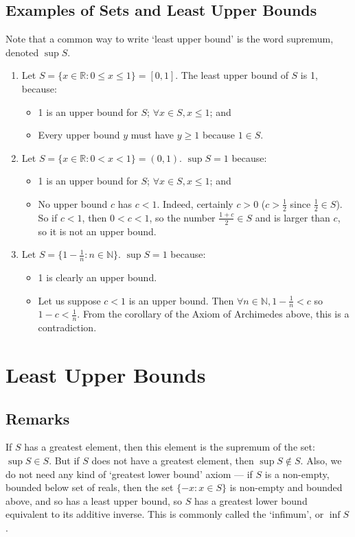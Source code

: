 \documentclass{article}
\begin{document}
\subsection{Examples of Sets and Least Upper Bounds}
Note that a common way to write `least upper bound' is the word supremum, denoted $\sup S$.
\begin{enumerate}
	\item Let $S = \{ x \in \mathbb R: 0 \leq x \leq 1 \} = [0, 1]$. The least upper bound of $S$ is 1, because:
	      \begin{itemize}
		      \item 1 is an upper bound for $S$; $\forall x \in S, x\leq1 $; and
		      \item Every upper bound $y$ must have $y \geq 1$ because $1 \in S$.
	      \end{itemize}
	\item Let $S = \{ x \in \mathbb R: 0 < x < 1 \} = (0, 1)$. $\sup S = 1$ because:
	      \begin{itemize}
		      \item 1 is an upper bound for $S$; $\forall x \in S, x \leq 1$; and
		      \item No upper bound $c$ has $c<1$. Indeed, certainly $c>0$ ($c > \frac{1}{2}$ since $\frac{1}{2} \in S$). So if $c<1$, then $0<c<1$, so the number $\frac{1+c}{2} \in S$ and is larger than $c$, so it is not an upper bound.
	      \end{itemize}
	\item Let $S = \{ 1 - \frac{1}{n}: n \in \mathbb N \}$. $\sup S = 1$ because:
	      \begin{itemize}
		      \item 1 is clearly an upper bound.
		      \item Let us suppose $c < 1$ is an upper bound. Then $\forall n \in \mathbb N, 1 - \frac{1}{n} < c$ so $1 - c < \frac{1}{n}$. From the corollary of the Axiom of Archimedes above, this is a contradiction.
	      \end{itemize}
\end{enumerate}

\section{Least Upper Bounds}
\subsection{Remarks}
If $S$ has a greatest element, then this element is the supremum of the set: $\sup S \in S$. But if $S$ does not have a greatest element, then $\sup S \notin S$. Also, we do not need any kind of `greatest lower bound' axiom --- if $S$ is a non-empty, bounded below set of reals, then the set $\{ -x: x \in S \}$ is non-empty and bounded above, and so has a least upper bound, so $S$ has a greatest lower bound equivalent to its additive inverse. This is commonly called the `infimum', or $\inf S$.
\end{document}
